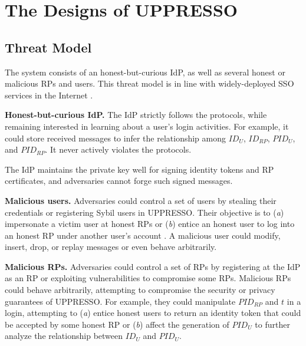 \section{The Designs of UPPRESSO}
\label{sec:UPPRESSO}


\subsection{Threat Model}
\label{subsec:threatmodel}
The system consists of an honest-but-curious IdP, as well as several honest or malicious RPs and users. This threat model is in line with widely-deployed SSO services in the Internet \cite{OpenIDConnect,rfc6749, SAML, SAMLIdentifier}.

\noindent \textbf{Honest-but-curious IdP.} The IdP strictly follows the protocols,
 while remaining interested in learning about a user's login activities.
For example, it could store received messages to infer the relationship among $ID_U$, $ID_{RP}$, $PID_{U}$, and $PID_{RP}$.
It never actively violates the protocols.

The IdP maintains the private key well for signing identity tokens and RP certificates, %
and adversaries cannot forge such signed messages.

\noindent \textbf{Malicious users.} Adversaries could control a set of users by stealing their credentials or registering Sybil users in UPPRESSO.
 Their objective is to (\emph{a}) impersonate a victim user at honest RPs or (\emph{b}) entice an honest user to log into an honest RP under another user's account  \cite{SPRESSO, FettKS14}.
A malicious user could modify, insert, drop, or replay messages or even behave arbitrarily.

\noindent \textbf{Malicious RPs.}
Adversaries could control a set of RPs by registering at the IdP as an RP or exploiting vulnerabilities to compromise some RPs.
Malicious RPs could behave arbitrarily, attempting to compromise the security or privacy guarantees of UPPRESSO.
For example, they could manipulate $PID_{RP}$ and $t$ in a login, attempting to (\emph{a}) entice honest users to return an identity token that could be accepted by some honest RP or (\emph{b}) affect the generation of $PID_U$ to further analyze the relationship between $ID_U$ and $PID_U$.

